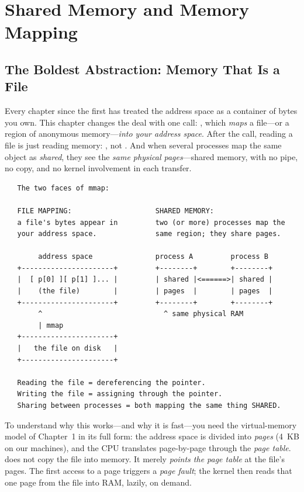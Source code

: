 
\chapter{Shared Memory and Memory Mapping}

\section{The Boldest Abstraction: Memory That Is a File}

Every chapter since the first has treated the address space as a
container of bytes you own. This chapter changes the deal with one
call: , which \emph{maps} a file---or a region of anonymous
memory---\emph{into your address space}. After the call, reading a
file is just reading memory: , not .
And when several processes map the same object as \emph{shared}, they
see the \emph{same physical pages}---shared memory, with no pipe, no
copy, and no kernel involvement in each transfer.

\begin{verbatim}
   The two faces of mmap:

   FILE MAPPING:                    SHARED MEMORY:
   a file's bytes appear in         two (or more) processes map the
   your address space.              same region; they share pages.

        address space               process A         process B
   +----------------------+         +--------+        +--------+
   |  [ p[0] ][ p[1] ]... |         | shared |<======>| shared |
   |    (the file)        |         | pages  |        | pages  |
   +----------------------+         +--------+        +--------+
        ^                             ^ same physical RAM
        | mmap
   +----------------------+
   |   the file on disk   |
   +----------------------+

   Reading the file = dereferencing the pointer.
   Writing the file = assigning through the pointer.
   Sharing between processes = both mapping the same thing SHARED.
\end{verbatim}

To understand why this works---and why it is fast---you need the
virtual-memory model of Chapter~1 in its full form: the address space
is divided into \emph{pages} (4~KB on our machines), and the CPU
translates page-by-page through the \emph{page table}. 
does not copy the file into memory. It merely \emph{points the page
table} at the file's pages. The first access to a page triggers a
\emph{page fault}; the kernel then reads that one page from the file
into RAM, lazily, on demand.

